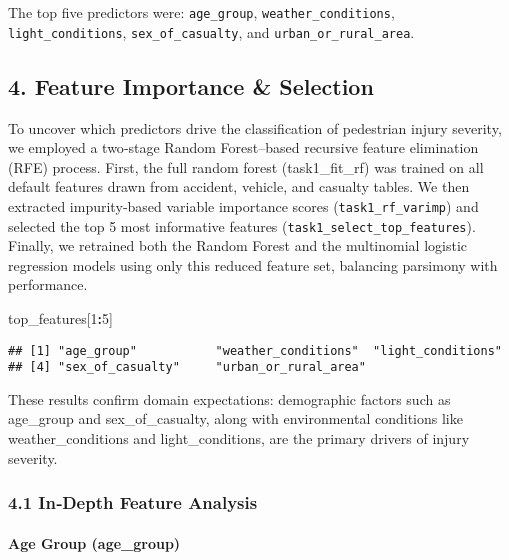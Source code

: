 \documentclass[
]{article}
\newenvironment{Shaded}{\begin{snugshade}}{\end{snugshade}}
\newcommand{\DecValTok}[1]{\textcolor[rgb]{0.00,0.00,0.81}{#1}}
\newcommand{\NormalTok}[1]{#1}
\newcommand{\SpecialCharTok}[1]{\textcolor[rgb]{0.81,0.36,0.00}{\textbf{#1}}}
\begin{document}
The top five predictors were: \texttt{age\_group},
\texttt{weather\_conditions}, \texttt{light\_conditions},
\texttt{sex\_of\_casualty}, and \texttt{urban\_or\_rural\_area}.

\subsection{4. Feature Importance \&
Selection}\label{feature-importance-selection}

To uncover which predictors drive the classification of pedestrian
injury severity, we employed a two‐stage Random Forest--based recursive
feature elimination (RFE) process. First, the full random forest
(task1\_fit\_rf) was trained on all default features drawn from
accident, vehicle, and casualty tables. We then extracted impurity‐based
variable importance scores (\texttt{task1\_rf\_varimp}) and selected the
top 5 most informative features (\texttt{task1\_select\_top\_features}).
Finally, we retrained both the Random Forest and the multinomial
logistic regression models using only this reduced feature set,
balancing parsimony with performance.

\begin{Shaded}
\begin{Highlighting}[]
\NormalTok{top\_features[}\DecValTok{1}\SpecialCharTok{:}\DecValTok{5}\NormalTok{]}
\end{Highlighting}
\end{Shaded}

\begin{verbatim}
## [1] "age_group"           "weather_conditions"  "light_conditions"   
## [4] "sex_of_casualty"     "urban_or_rural_area"
\end{verbatim}

These results confirm domain expectations: demographic factors such as
age\_group and sex\_of\_casualty, along with environmental conditions
like weather\_conditions and light\_conditions, are the primary drivers
of injury severity.

\subsubsection{4.1 In‑Depth Feature
Analysis}\label{indepth-feature-analysis}

\paragraph{Age Group (age\_group)}\label{age-group-age_group}
\end{document}
